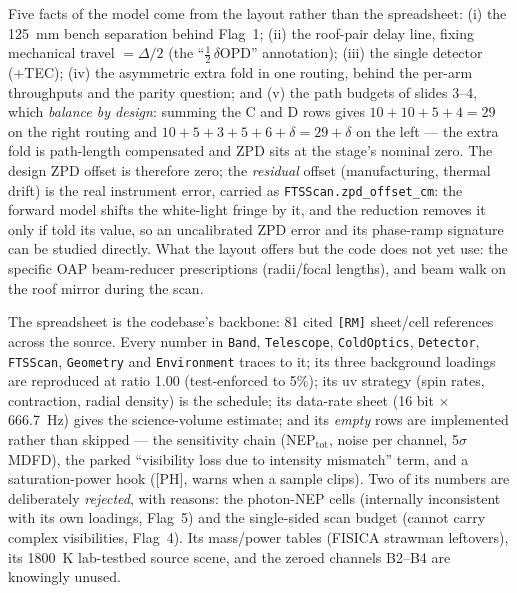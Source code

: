 \documentclass[11pt]{article}
\newcommand{\code}[1]{\texttt{\small #1}}
\begin{document}
\begin{decisionbox}[title={\textsc{What the code takes from the optical
layout slides}}]
Five facts of the model come from the layout rather than the spreadsheet:
(i) the \SI{125}{\milli\metre} bench separation behind Flag~1; (ii) the
roof-pair delay line, fixing mechanical travel $=\Delta/2$ (the
``$\tfrac12\,\delta$OPD'' annotation); (iii) the single detector (+TEC);
(iv) the asymmetric extra fold in one routing, behind the per-arm
throughputs and the parity question; and (v) the path budgets of slides
3--4, which \emph{balance by design}: summing the C and D rows gives
$10{+}10{+}5{+}4 = 29$ on the right routing and
$10{+}5{+}3{+}5{+}6{+}\delta = 29{+}\delta$ on the left --- the extra fold
is path-length compensated and ZPD sits at the stage's nominal zero. The
design ZPD offset is therefore zero; the \emph{residual} offset
(manufacturing, thermal drift) is the real instrument error, carried as
\code{FTSScan.zpd\_offset\_cm}: the forward model shifts the white-light
fringe by it, and the reduction removes it only if told its value, so an
uncalibrated ZPD error and its phase-ramp signature can be studied
directly. What the layout offers but the code does not yet use: the
specific OAP beam-reducer prescriptions (radii/focal lengths), and beam
walk on the roof mirror during the scan.
\end{decisionbox}

\begin{decisionbox}[title={\textsc{What the code takes from the radiometric
model}}]
The spreadsheet is the codebase's backbone: 81 cited \code{[RM]} sheet/cell
references across the source. Every number in \code{Band}, \code{Telescope},
\code{ColdOptics}, \code{Detector}, \code{FTSScan}, \code{Geometry} and
\code{Environment} traces to it; its three background loadings are
reproduced at ratio 1.00 (test-enforced to 5\%); its uv strategy (spin
rates, contraction, radial density) is the schedule; its data-rate sheet
(16 bit $\times$ \SI{666.7}{\hertz}) gives the science-volume estimate;
and its \emph{empty} rows are implemented rather than skipped --- the
sensitivity chain (NEP$_\mathrm{tot}$, noise per channel, 5$\sigma$ MDFD),
the parked ``visibility loss due to intensity mismatch'' term, and a
saturation-power hook ([PH], warns when a sample clips). Two of its numbers
are deliberately \emph{rejected}, with reasons: the photon-NEP cells
(internally inconsistent with its own loadings, Flag~5) and the
single-sided scan budget (cannot carry complex visibilities, Flag~4). Its
mass/power tables (FISICA strawman leftovers), its \SI{1800}{\kelvin}
lab-testbed source scene, and the zeroed channels B2--B4 are knowingly
unused.
\end{decisionbox}
\end{document}
